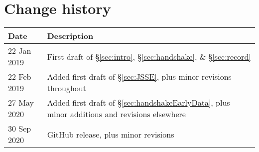 \section*{Change history}


\begin{tabular}{l|l}
Date        & Description \\ \hline
22 Jan 2019 & First draft of \S\ref{sec:intro}, \S\ref{sec:handshake}, \& \S\ref{sec:record}    \\
22 Feb 2019 & Added first draft of \S\ref{sec:JSSE}, plus minor revisions throughout            \\
27 May 2020 & Added first draft of \S\ref{sec:handshakeEarlyData}, plus minor additions and 
              revisions elsewhere                                                               \\
30 Sep 2020 & GitHub release, plus minor revisions
\end{tabular}


